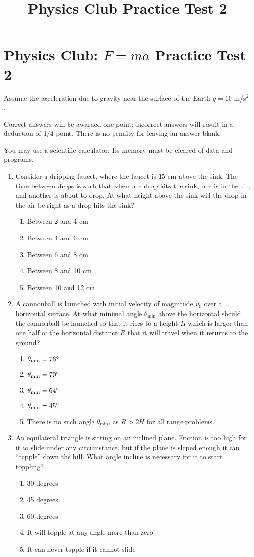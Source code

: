 \documentclass[12pt,letterpaper]{article}
\title{Physics Club Practice Test 2}
\begin{document}
\section*{Physics Club: $F=ma$ Practice Test 2}
Assume the acceleration due to gravity near the surface of the Earth $g = 10$ m/s$^2$.
\smallskip

Correct answers will be awarded one point; incorrect answers will result in a deduction of 1/4 point. There is no penalty for leaving an answer blank.
\smallskip

You may use a scientific calculator. Its memory must be cleared of data and programs.

\begin{enumerate}

\item
Consider a dripping faucet, where the faucet is 15 cm above the sink. The time between drops is such that when one drop hits the sink, one is in the air, and another is about to drop. At what height above the sink will the drop in the air be right as a drop hits the sink?
\begin{enumerate}
\item Between 2 and 4 cm
\item Between 4 and 6 cm
\item Between 6 and 8 cm
\item Between 8 and 10 cm
\item Between 10 and 12 cm
\end{enumerate}

\item
A cannonball is launched with initial velocity of magnitude $v_0$ over a horizontal surface. At what minimal angle $\theta_\text{min}$ above the horizontal should the cannonball be launched so that it rises to a height $H$ which is larger than one half of the horizontal distance $R$ that it will travel when it returns to the ground?
\begin{enumerate}
\item $\theta_\text{min} = 76\degree$
\item $\theta_\text{min} = 70\degree$
\item $\theta_\text{min} = 64\degree$
\item $\theta_\text{min} = 45\degree$
\item There is no such angle $\theta_\text{min}$, as $R>2H$ for all range problems.
\end{enumerate}

\item
An equilateral triangle is sitting on an inclined plane. Friction is too high for it to slide under any circumstance, but if the plane is sloped enough it can ``topple'' down the hill. What angle incline is necessary for it to start toppling?
\begin{enumerate}
\item 30 degrees
\item 45 degrees
\item 60 degrees
\item It will topple at any angle more than zero
\item It can never topple if it cannot slide
\end{enumerate}


\end{enumerate}
\end{document}
